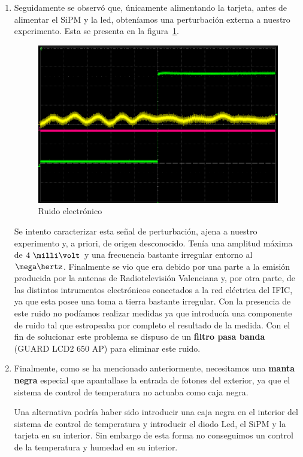 \begin{enumerate}
\item {} Seguidamente se observó que, únicamente alimentando la tarjeta, antes de alimentar el SiPM y la led, obteníamos una perturbación externa a nuestro experimento. Esta se presenta en la figura~\ref{Ruido}. 

\begin{figure}[hbtp]
\centering
\includegraphics[scale=0.4]{ruido.png}
\caption{Ruido electrónico\label{Ruido}}
\end{figure}

Se intento caracterizar esta señal de perturbación, ajena a nuestro experimento y, a priori, de origen desconocido. Tenía una amplitud máxima de $4~\milli\volt$ y una frecuencia bastante irregular entorno al $\mega\hertz$. Finalmente se vio que era debido por una parte a la emisión producida por la antenas de Radiotelevisión Valenciana y, por otra parte, de las distintos intrumentos electrónicos conectados a la red eléctrica del IFIC, ya que esta posee una toma a tierra bastante irregular. 
Con la presencia de este ruido no podíamos realizar medidas ya que introducía una componente de ruido tal que estropeaba por completo el resultado de la medida. Con el fin de solucionar este problema se dispuso de un \textbf{filtro pasa banda} (GUARD LCD2 650 AP) para eliminar este ruido.

\item {} Finalmente, como se ha mencionado anteriormente, necesitamos una \textbf{manta negra} especial que apantallase la entrada de fotones del exterior, ya que el sistema de control de temperatura no actuaba como caja negra.

Una alternativa podría haber sido introducir una caja negra en el interior del sistema de control de temperatura y introducir el diodo Led, el SiPM y la tarjeta en su interior. Sin embargo de esta forma no conseguimos un control de la temperatura y humedad en su interior.

\end{enumerate}
